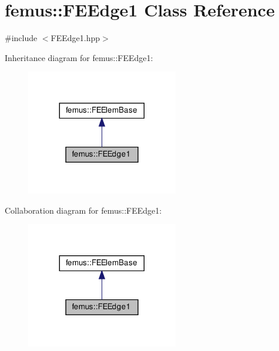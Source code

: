 \hypertarget{classfemus_1_1_f_e_edge1}{}\section{femus\+:\+:F\+E\+Edge1 Class Reference}
\label{classfemus_1_1_f_e_edge1}


{\ttfamily \#include $<$F\+E\+Edge1.\+hpp$>$}



Inheritance diagram for femus\+:\+:F\+E\+Edge1\+:
\nopagebreak
\begin{figure}[H]
\begin{center}
\leavevmode
\includegraphics[width=188pt]{classfemus_1_1_f_e_edge1__inherit__graph}
\end{center}
\end{figure}


Collaboration diagram for femus\+:\+:F\+E\+Edge1\+:
\nopagebreak
\begin{figure}[H]
\begin{center}
\leavevmode
\includegraphics[width=188pt]{classfemus_1_1_f_e_edge1__coll__graph}
\end{center}
\end{figure}
